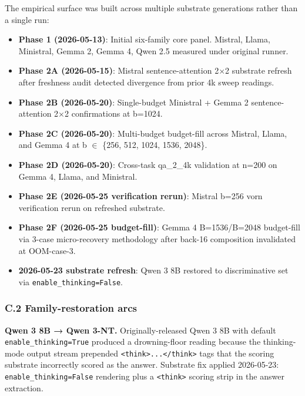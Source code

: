 \documentclass[
]{article}
\providecommand{\tightlist}{%
  \setlength{\itemsep}{0pt}\setlength{\parskip}{0pt}}
\begin{document}
The empirical surface was built across multiple substrate generations
rather than a single run:

\begin{itemize}
\tightlist
\item
  \textbf{Phase 1 (2026-05-13)}: Initial six-family core panel. Mistral,
  Llama, Ministral, Gemma 2, Gemma 4, Qwen 2.5 measured under original
  runner.
\item
  \textbf{Phase 2A (2026-05-15)}: Mistral sentence-attention 2$\times$2
  substrate refresh after freshness audit detected divergence from prior
  4k sweep readings.
\item
  \textbf{Phase 2B (2026-05-20)}: Single-budget Ministral + Gemma 2
  sentence-attention 2$\times$2 confirmations at b=1024.
\item
  \textbf{Phase 2C (2026-05-20)}: Multi-budget budget-fill across
  Mistral, Llama, and Gemma 4 at b $\in$ \{256, 512, 1024, 1536, 2048\}.
\item
  \textbf{Phase 2D (2026-05-20)}: Cross-task qa\_2\_4k validation at
  n=200 on Gemma 4, Llama, and Ministral.
\item
  \textbf{Phase 2E (2026-05-25 verification rerun)}: Mistral b=256 vorn
  verification rerun on refreshed substrate.
\item
  \textbf{Phase 2F (2026-05-25 budget-fill)}: Gemma 4 B=1536/B=2048
  budget-fill via 3-case micro-recovery methodology after back-16
  composition invalidated at OOM-case-3.
\item
  \textbf{2026-05-23 substrate refresh}: Qwen 3 8B restored to
  discriminative set via \texttt{enable\_thinking=False}.
\end{itemize}

\subsubsection{C.2 Family-restoration arcs}\label{c-2-family-restoration-arcs}

\textbf{Qwen 3 8B → Qwen 3-NT.} Originally-released Qwen 3 8B with
default \texttt{enable\_thinking=True} produced a drowning-floor reading
because the thinking-mode output stream prepended
\texttt{\textless{}think\textgreater{}...\textless{}/think\textgreater{}}
tags that the scoring substrate incorrectly scored as the answer.
Substrate fix applied 2026-05-23: \texttt{enable\_thinking=False}
rendering plus a \texttt{\textless{}think\textgreater{}} scoring strip
in the answer extraction.
\end{document}
